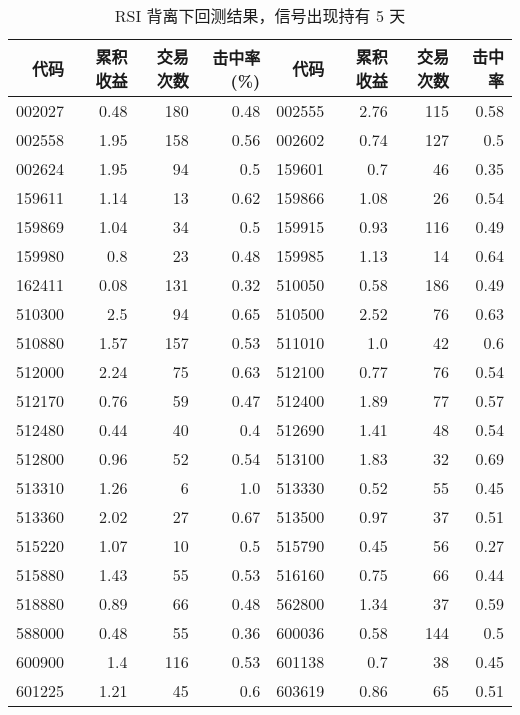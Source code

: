 \begin{table}
    \centering
    \caption{RSI 背离下回测结果，信号出现持有 5 天}
    \begin{tabular}{rrrrrrrr}
        \hline
        代码     & 累积收益 & 交易次数 & 击中率(\%) & 代码     & 累积收益 & 交易次数 & 击中率  \\
        \hline
        002027 & 0.48 & 180  & 0.48    & 002555 & 2.76 & 115  & 0.58 \\
        002558 & 1.95 & 158  & 0.56    & 002602 & 0.74 & 127  & 0.5  \\
        002624 & 1.95 & 94   & 0.5     & 159601 & 0.7  & 46   & 0.35 \\
        159611 & 1.14 & 13   & 0.62    & 159866 & 1.08 & 26   & 0.54 \\
        159869 & 1.04 & 34   & 0.5     & 159915 & 0.93 & 116  & 0.49 \\
        159980 & 0.8  & 23   & 0.48    & 159985 & 1.13 & 14   & 0.64 \\
        162411 & 0.08 & 131  & 0.32    & 510050 & 0.58 & 186  & 0.49 \\
        510300 & 2.5  & 94   & 0.65    & 510500 & 2.52 & 76   & 0.63 \\
        510880 & 1.57 & 157  & 0.53    & 511010 & 1.0  & 42   & 0.6  \\
        512000 & 2.24 & 75   & 0.63    & 512100 & 0.77 & 76   & 0.54 \\
        512170 & 0.76 & 59   & 0.47    & 512400 & 1.89 & 77   & 0.57 \\
        512480 & 0.44 & 40   & 0.4     & 512690 & 1.41 & 48   & 0.54 \\
        512800 & 0.96 & 52   & 0.54    & 513100 & 1.83 & 32   & 0.69 \\
        513310 & 1.26 & 6    & 1.0     & 513330 & 0.52 & 55   & 0.45 \\
        513360 & 2.02 & 27   & 0.67    & 513500 & 0.97 & 37   & 0.51 \\
        515220 & 1.07 & 10   & 0.5     & 515790 & 0.45 & 56   & 0.27 \\
        515880 & 1.43 & 55   & 0.53    & 516160 & 0.75 & 66   & 0.44 \\
        518880 & 0.89 & 66   & 0.48    & 562800 & 1.34 & 37   & 0.59 \\
        588000 & 0.48 & 55   & 0.36    & 600036 & 0.58 & 144  & 0.5  \\
        600900 & 1.4  & 116  & 0.53    & 601138 & 0.7  & 38   & 0.45 \\
        601225 & 1.21 & 45   & 0.6     & 603619 & 0.86 & 65   & 0.51 \\
        \hline
    \end{tabular}
\end{table}
